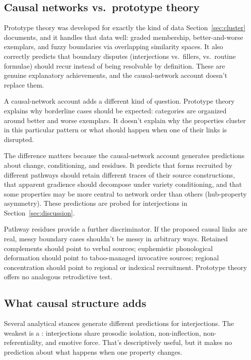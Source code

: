 \documentclass[12pt]{article}
\begin{document}
\subsection{Causal networks vs.\ prototype theory}

Prototype theory \citep{rosch1975,taylor2003} was developed for exactly
the kind of data Section~\ref{sec:cluster} documents, and it handles
that data well: graded membership, better-and-worse exemplars, and
fuzzy boundaries via overlapping similarity spaces. It also correctly
predicts that boundary disputes (interjections vs.\ fillers, vs.\
routine formulae) should recur instead of being resolvable by
definition. These are genuine explanatory achievements, and the
causal-network account doesn't replace them.

A causal-network account adds a different kind of question. Prototype
theory explains why borderline cases should be expected: categories are
organized around better and worse exemplars. It doesn't explain why
the properties cluster in this particular pattern or what should happen
when one of their links is disrupted.

The difference matters because the causal-network account generates
predictions about change, conditioning, and residues. It predicts that
forms recruited by different pathways should retain different traces of
their source constructions, that apparent gradience should decompose
under variety conditioning, and that some properties may be more central
to network order than others (hub-property asymmetry). These
predictions are probed for interjections in Section~\ref{sec:discussion}.

Pathway residues provide a further discriminator. If the proposed causal
links are real, messy boundary cases shouldn't be messy in arbitrary
ways. Retained complements should point to verbal sources; euphemistic
phonological deformation should point to taboo-managed invocative
sources; regional concentration should point to regional or indexical
recruitment. Prototype theory offers no analogous retrodictive test.

\subsection{What causal structure adds}

Several analytical stances generate different predictions for
interjections. The weakest is a : interjections share
prosodic isolation, non-inflection, non-referentiality, and emotive
force. That's descriptively useful, but it makes no prediction about
what happens when one property changes.
\end{document}
